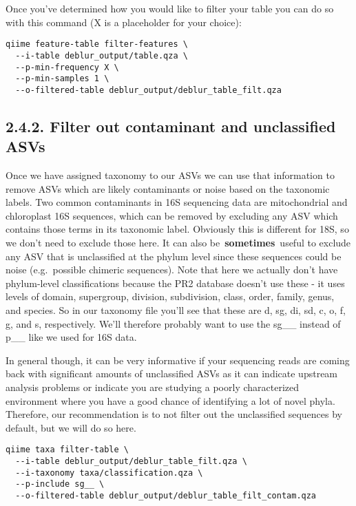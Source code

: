 \documentclass[
]{book}
\begin{document}
Once you've determined how you would like to filter your table you can do so with this command (X is a placeholder for your choice):

\begin{verbatim}
qiime feature-table filter-features \
  --i-table deblur_output/table.qza \
  --p-min-frequency X \
  --p-min-samples 1 \
  --o-filtered-table deblur_output/deblur_table_filt.qza
\end{verbatim}

\subsection{2.4.2. Filter out contaminant and unclassified ASVs}\label{filter-out-contaminant-and-unclassified-asvs-1}

Once we have assigned taxonomy to our ASVs we can use that information to remove ASVs which are likely contaminants or noise based on the taxonomic labels. Two common contaminants in 16S sequencing data are mitochondrial and chloroplast 16S sequences, which can be removed by excluding any ASV which contains those terms in its taxonomic label. Obviously this is different for 18S, so we don't need to exclude those here. It can also be~\textbf{sometimes}~useful to exclude any ASV that is unclassified at the phylum level since these sequences could be noise (e.g.~possible chimeric sequences). Note that here we actually don't have phylum-level classifications because the PR2 database doesn't use these - it uses levels of domain, supergroup, division, subdivision, class, order, family, genus, and species. So in our taxonomy file you'll see that these are d, sg, di, sd, c, o, f, g, and s, respectively. We'll therefore probably want to use the sg\_\_ instead of p\_\_ like we used for 16S data.

In general though, it can be very informative if your sequencing reads are coming back with significant amounts of unclassified ASVs as it can indicate upstream analysis problems or indicate you are studying a poorly characterized environment where you have a good chance of identifying a lot of novel phyla. Therefore, our recommendation is to not filter out the unclassified sequences by default, but we will do so here.

\begin{verbatim}
qiime taxa filter-table \
  --i-table deblur_output/deblur_table_filt.qza \
  --i-taxonomy taxa/classification.qza \
  --p-include sg__ \
  --o-filtered-table deblur_output/deblur_table_filt_contam.qza
\end{verbatim}
\end{document}
